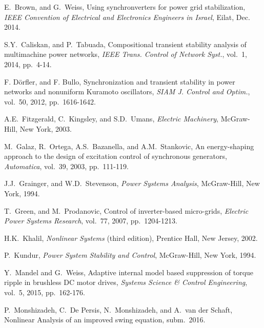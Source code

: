 \documentclass{ifacconf}
\newcommand{\m}      {{\hbox{\hskip 1pt}}}
\begin{document}
\begin{thebibliography}{99}
 
 E.~Brown, and G.~Weiss, \m 
 Using synchronverters for power grid stabilization, {\em IEEE 
 Convention of Electrical and Electronics Engineers in Israel}, Eilat, 
 Dec. 2014.

 S.Y.~Caliskan, and 
 P.~Tabuada, \m Compositional transient stability analysis of 
 multimachine power networks, {\em IEEE Trans. Control of Network
 Syst.}, vol.~1, 2014, pp.~4-14.

 F. D{\"o}rfler, and 
 F. Bullo, \m Synchronization and transient stability in power 
 networks and nonuniform Kuramoto oscillators, {\em SIAM J. Control 
 and Optim.}, vol.~50, 2012, pp.~1616-1642.

 A.E.~Fitzgerald, 
 C.~Kingsley, and S.D.~Umans, \m {\em Electric Machinery}, \m 
 McGraw-Hill, New York, 2003.

 M.~Galaz, R.~Ortega, 
 A.S.~Bazanella, and A.M.~Stankovic, \m An energy-shaping approach 
 to the design of excitation control of synchronous generators, 
 {\em Automatica}, vol.~39, 2003, pp.~111-119.

 J.J.~Grainger, and 
 W.D.~Stevenson, {\em Power Systems Analysis}, \m McGraw-Hill, New 
 York, 1994.
 
 T.~Green, and 
 M.~Prodanovic, \m Control of inverter-based micro-grids, {\em 
 Electric Power Systems Research}, vol.~77, 2007, pp.~1204-1213.
 
 H.K.~Khalil, \m \emph{Nonlinear 
 Systems} (third edition), Prentice Hall, New Jersey, 2002.

 P.~Kundur, \emph{Power System 
 Stability and Control}, McGraw-Hill, New York, 1994.

 Y.~Mandel and G.~Weiss, \m 
 Adaptive internal model based suppression of torque ripple in 
 brushless DC motor drives, {\em Systems Science \& Control 
 Engineering}, vol.~5, 2015, pp.~162-176.

 P.~Monshizadeh, C.~De Persis, N.~Monshizadeh, and A.~van der 
 Schaft, \m Nonlinear Analysis of an improved swing equation, \m 
 subm.~2016.


\end{thebibliography}
\end{document}
